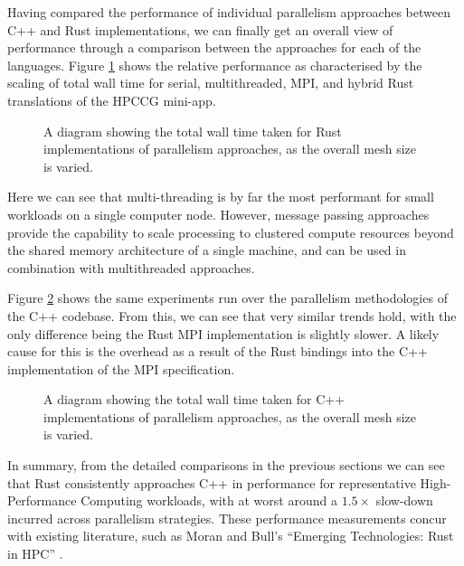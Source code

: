 Having compared the performance of individual parallelism approaches between C++ and Rust implementations, we can finally get an overall view of performance through a comparison between the approaches for each of the languages. Figure \ref{fig:translation_parallelism_rust} shows the relative performance as characterised by the scaling of total wall time for serial, multithreaded, MPI, and hybrid Rust translations of the HPCCG mini-app.

\begin{figure}[H]
    \centering
    
    \caption{A diagram showing the total wall time taken for Rust implementations of parallelism approaches, as the overall mesh size is varied.}
    \label{fig:translation_parallelism_rust}
\end{figure}

Here we can see that multi-threading is by far the most performant for small workloads on a single computer node. However, message passing approaches provide the capability to scale processing to clustered compute resources beyond the shared memory architecture of a single machine, and can be used in combination with multithreaded approaches.

Figure \ref{fig:translation_parallelism_cpp} shows the same experiments run over the parallelism methodologies of the C++ codebase. From this, we can see that very similar trends hold, with the only difference being the Rust MPI implementation is slightly slower. A likely cause for this is the overhead as a result of the Rust bindings into the C++ implementation of the MPI specification.

\begin{figure}[H]
    \centering
    
    \caption{A diagram showing the total wall time taken for C++ implementations of parallelism approaches, as the overall mesh size is varied.}
    \label{fig:translation_parallelism_cpp}
\end{figure}

In summary, from the detailed comparisons in the previous sections we can see that Rust consistently approaches C++ in performance for representative High-Performance Computing workloads, with at worst around a $1.5 \times$ slow-down incurred across parallelism strategies. These performance measurements concur with existing literature, such as Moran and Bull's ``Emerging Technologies: Rust in HPC'' \cite{moranEmergingTechnologiesRust2023}.

